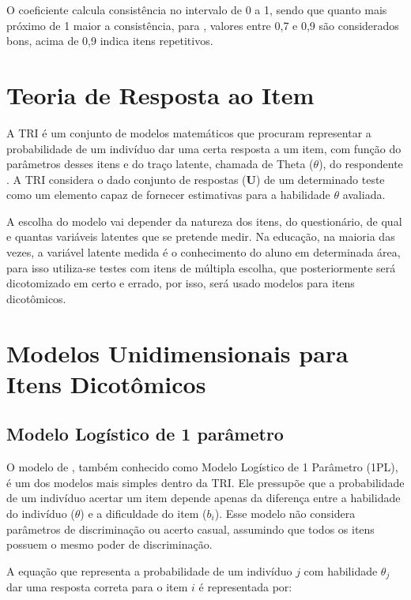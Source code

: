 O coeficiente calcula consistência no intervalo de 0 a 1, sendo que quanto mais próximo de 1 maior a consistência, para , valores entre 0,7 e 0,9 são considerados bons, acima de 0,9 indica itens repetitivos.

\section{Teoria de Resposta ao Item}

A TRI é um conjunto de modelos matemáticos que procuram representar a probabilidade de um indivíduo dar uma certa resposta a um item, com função do parâmetros desses itens e do traço latente, chamada de Theta ($\theta$), do respondente \cite{de2000teoria}. A TRI considera o dado conjunto de respostas ($\textbf{U}$) de um determinado teste como um elemento capaz de fornecer estimativas para a habilidade $\theta$ avaliada. \cite{baker2001}

A escolha do modelo vai depender da natureza dos itens, do questionário, de qual e quantas variáveis latentes que se pretende medir. Na educação, na maioria das vezes, a variável latente medida é o conhecimento do aluno em determinada área, para isso utiliza-se testes com itens de múltipla escolha, que posteriormente será dicotomizado em certo e errado, por isso, será usado modelos para itens dicotômicos. 





\section{Modelos Unidimensionais para Itens Dicotômicos}

\subsection{Modelo Logístico de 1 parâmetro}

O modelo de , também conhecido como Modelo Logístico de 1 Parâmetro (1PL), é um dos modelos mais simples dentro da TRI. Ele pressupõe que a probabilidade de um indivíduo acertar um item depende apenas da diferença entre a habilidade do indivíduo ($\theta$) e a dificuldade do item ($b_i$). Esse modelo não considera parâmetros de discriminação ou acerto casual, assumindo que todos os itens possuem o mesmo poder de discriminação.


A equação que representa a probabilidade de um indivíduo $ j $ com habilidade $ \theta_j $ dar uma resposta correta para o item $ i $ é representada por:

